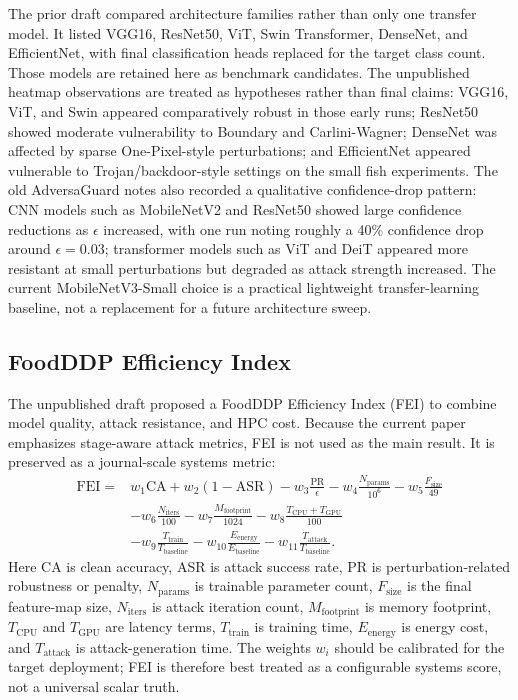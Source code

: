 \documentclass[conference]{IEEEtran}
\begin{document}
The prior draft compared architecture families rather than only one transfer model. It listed VGG16, ResNet50, ViT, Swin Transformer, DenseNet, and EfficientNet, with final classification heads replaced for the target class count. Those models are retained here as benchmark candidates. The unpublished heatmap observations are treated as hypotheses rather than final claims: VGG16, ViT, and Swin appeared comparatively robust in those early runs; ResNet50 showed moderate vulnerability to Boundary and Carlini-Wagner; DenseNet was affected by sparse One-Pixel-style perturbations; and EfficientNet appeared vulnerable to Trojan/backdoor-style settings on the small fish experiments. The old AdversaGuard notes also recorded a qualitative confidence-drop pattern: CNN models such as MobileNetV2 and ResNet50 showed large confidence reductions as \(\epsilon\) increased, with one run noting roughly a 40\% confidence drop around \(\epsilon=0.03\); transformer models such as ViT and DeiT appeared more resistant at small perturbations but degraded as attack strength increased. The current MobileNetV3-Small choice is a practical lightweight transfer-learning baseline, not a replacement for a future architecture sweep.

\subsection{FoodDDP Efficiency Index}

The unpublished draft proposed a FoodDDP Efficiency Index (FEI) to combine model quality, attack resistance, and HPC cost. Because the current paper emphasizes stage-aware attack metrics, FEI is not used as the main result. It is preserved as a journal-scale systems metric:
\begin{equation}
\begin{aligned}
\mathrm{FEI}={}&
w_1\mathrm{CA}+w_2(1-\mathrm{ASR})
-w_3\frac{\mathrm{PR}}{\epsilon}
-w_4\frac{N_{\mathrm{params}}}{10^6}
-w_5\frac{F_{\mathrm{size}}}{49}\\
&-w_6\frac{N_{\mathrm{iters}}}{100}
-w_7\frac{M_{\mathrm{footprint}}}{1024}
-w_8\frac{T_{\mathrm{CPU}}+T_{\mathrm{GPU}}}{100}\\
&-w_9\frac{T_{\mathrm{train}}}{T_{\mathrm{baseline}}}
-w_{10}\frac{E_{\mathrm{energy}}}{E_{\mathrm{baseline}}}
-w_{11}\frac{T_{\mathrm{attack}}}{T_{\mathrm{baseline}}}.
\end{aligned}
\label{eq:fei}
\end{equation}
Here CA is clean accuracy, ASR is attack success rate, PR is perturbation-related robustness or penalty, \(N_{\mathrm{params}}\) is trainable parameter count, \(F_{\mathrm{size}}\) is the final feature-map size, \(N_{\mathrm{iters}}\) is attack iteration count, \(M_{\mathrm{footprint}}\) is memory footprint, \(T_{\mathrm{CPU}}\) and \(T_{\mathrm{GPU}}\) are latency terms, \(T_{\mathrm{train}}\) is training time, \(E_{\mathrm{energy}}\) is energy cost, and \(T_{\mathrm{attack}}\) is attack-generation time. The weights \(w_i\) should be calibrated for the target deployment; FEI is therefore best treated as a configurable systems score, not a universal scalar truth.
\end{document}
